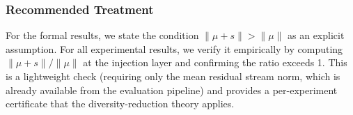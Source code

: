 \subsubsection{Recommended Treatment}

For the formal results, we state the condition
$\|\mu + s\| > \|\mu\|$ as an explicit assumption.
For all experimental results, we verify it empirically by computing
$\|\mu + s\| / \|\mu\|$ at the injection layer and confirming the
ratio exceeds 1.
This is a lightweight check (requiring only the mean residual stream
norm, which is already available from the evaluation pipeline) and
provides a per-experiment certificate that the diversity-reduction
theory applies.
